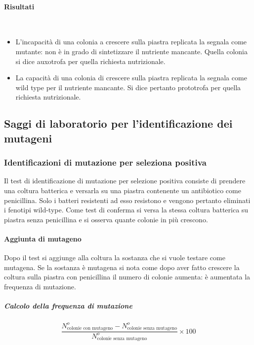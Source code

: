 			\paragraph{Risultati}\mbox{}\\
			\begin{multicols}{2}
				\begin{itemize}
	    				\item L'incapacità di una colonia a crescere sulla piastra replicata la segnala come mutante: non \`e in grado di sintetizzare il nutriente mancante.
						Quella colonia si dice auxotrofa per quella richiesta nutrizionale.
	    				\item La capacit\`a di una colonia di crescere sulla piastra replicata la segnala come wild type per il nutriente mancante.
						Si dice pertanto prototrofa per quella richiesta nutrizionale.
				\end{itemize}
			\end{multicols}
	
	\subsection{Saggi di laboratorio per l'identificazione dei mutageni}

		\subsubsection{Identificazioni di mutazione per seleziona positiva}
		Il test di identificazione di mutazione per selezione positiva consiste di prendere una coltura batterica e versarla su una piastra contenente un antibiotico come penicillina.
		Solo i batteri resistenti ad esso resistono e vengono pertanto eliminati i fenotipi wild-type.
		Come test di conferma si versa la stessa coltura batterica su piastra senza penicillina e si osserva quante colonie in pi\`u crescono.
			
			\paragraph{Aggiunta di mutageno}
			Dopo il test si aggiunge alla coltura la sostanza che si vuole testare come mutagena.
			Se la sostanza \`e mutagena si nota come dopo aver fatto crescere la coltura sulla piastra con penicillina il numero di colonie aumenta: \`e aumentata la frequenza di mutazione.

				\subparagraph{Calcolo della frequenza di mutazione}
				\[\dfrac{N^{o}_{\text{colonie con mutageno}} - N^{o}_{\text{colonie senza mutageno}}}{N^{o}_{\text{colonie senza mutageno}}} \times 100\]

